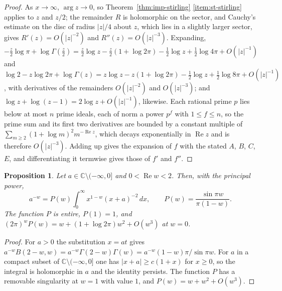 \documentclass[11pt]{amsart}
\theoremstyle{plain}
\newtheorem{proposition}[theorem]{Proposition}
\theoremstyle{definition}
\theoremstyle{remark}
\numberwithin{equation}{section}
\newcommand{\C}{\mathbb{C}}
\DeclareMathOperator{\Rea}{Re}
\renewcommand{\Re}{\Rea}
\begin{document}
\begin{proof}
As $x\to\infty$, $\arg z\to0$, so Theorem~\ref{thm:imp-stirling}
\ref{item:st-stirling} applies to $z$ and $z/2$; the remainder $R$ is
holomorphic on the sector, and Cauchy's estimate on the disc of radius
$|z|/4$ about $z$, which lies in a slightly larger sector, gives
$R'(z)=O(|z|^{-2})$ and $R''(z)=O(|z|^{-3})$. Expanding,
$-\tfrac z2\log\pi+\log\Gamma(\tfrac z2)=\tfrac z2\log z
-\tfrac z2(1+\log2\pi)-\tfrac12\log z+\tfrac12\log4\pi+O(|z|^{-1})$ and
$\log2-z\log2\pi+\log\Gamma(z)=z\log z-z(1+\log2\pi)-\tfrac12\log z
+\tfrac12\log8\pi+O(|z|^{-1})$, with derivatives of the remainders
$O(|z|^{-2})$ and $O(|z|^{-3})$; and $\log z+\log(z-1)=2\log z
+O(|z|^{-1})$, likewise. Each rational prime $p$ lies below at most
$n$ prime ideals, each of norm a power $p^{f}$ with $1\le f\le n$, so
the prime sum and its first two derivatives are bounded by a constant
multiple of $\sum_{m\ge2}(1+\log m)^2m^{-\Re z}$, which decays
exponentially in $\Re z$ and is therefore $O(|z|^{-3})$. Adding
up gives the expansion of $f$ with the stated $A$, $B$, $C$, $E$, and
differentiating it termwise gives those of $f'$ and $f''$.
\end{proof}

\begin{proposition}\label{prop:beta}
Let $a\in\C\setminus(-\infty,0]$ and $0<\Re w<2$. Then, with the
principal power,
\[
a^{-w}=P(w)\int_0^\infty x^{1-w}(x+a)^{-2}\,dx,\qquad
P(w)=\frac{\sin\pi w}{\pi(1-w)}.
\]
The function $P$ is entire, $P(1)=1$, and
$(2\pi)^wP(w)=w+(1+\log2\pi)w^2+O(w^3)$ at $w=0$.
\end{proposition}

\begin{proof}
For $a>0$ the substitution $x=at$ gives $a^{-w}B(2-w,w)=
a^{-w}\Gamma(2-w)\Gamma(w)=a^{-w}(1-w)\pi/\sin\pi w$. For $a$ in a
compact subset of $\C\setminus(-\infty,0]$ one has $|x+a|\ge c(1+x)$
for $x\ge0$, so the integral is holomorphic in $a$ and the identity
persists. The function $P$ has a removable singularity at $w=1$ with
value $1$, and $P(w)=w+w^2+O(w^3)$.
\end{proof}
\end{document}

